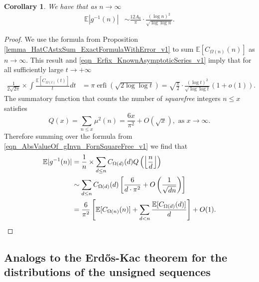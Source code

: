 \documentclass[11pt,reqno,a4letter]{article}
\numberwithin{figure}{section}
\numberwithin{table}{section}
\newcommand{\seqnum}[1]{\href{http://oeis.org/#1}{\color{ProcessBlue}{\underline{#1}}}}
\newcommand{\Floor}[2]{\ensuremath{\left\lfloor \frac{#1}{#2} \right\rfloor}}
\theoremstyle{plain}
\newtheorem{cor}[theorem]{Corollary}
\numberwithin{theorem}{section}
\theoremstyle{definition}
\begin{document}
\begin{cor}
\label{cor_ExpectationFormulaAbsgInvn_v2} 
We have that as $n \rightarrow \infty$ 
\begin{align*} 
\mathbb{E}|g^{-1}(n)| & \sim \frac{12A_0}{\pi} \cdot 
     \frac{(\log n)^2}{\sqrt{\log\log n}}. 
\end{align*} 
\end{cor} 
\begin{proof} 
We use the formula from Proposition \ref{lemma_HatCAstxSum_ExactFormulaWithError_v1} 
to sum $\mathbb{E}[C_{\Omega(n)}(n)]$ as $n \rightarrow \infty$.
This result and \eqref{eqn_Erfix_KnownAsymptoticSeries_v1} 
imply that for all sufficiently large $t \rightarrow +\infty$ 
\begin{align*} 
\frac{1}{2 \sqrt{2\pi}} \times \int \frac{\mathbb{E}[C_{\Omega(t)}(t)]}{t} dt & = 
     \pi \operatorname{erfi}\left(\sqrt{2\log\log t}\right) = 
     \sqrt{\frac{\pi}{2}} \cdot \frac{(\log t)^2}{\sqrt{\log\log t}} (1+o(1)). 
\end{align*} 
The summatory function that counts the 
number of \emph{squarefree} integers $n \leq x$ satisfies 
\cite[\S 18.6]{HARDYWRIGHT} \cite[\seqnum{A013928}]{OEIS} 
\[ 
Q(x) = \sum_{n \leq x} \mu^2(n) = \frac{6x}{\pi^2} + O\left(\sqrt{x}\right), 
     \text{\ as $x \rightarrow \infty$}. 
\]
Therefore summing over the formula from 
\eqref{eqn_AbsValueOf_gInvn_FornSquareFree_v1} we find that  
\begin{align} 
\notag 
\mathbb{E}|g^{-1}(n)| & = \frac{1}{n} \times \sum_{d \leq n} 
     C_{\Omega(d)}(d) Q\left(\Floor{n}{d}\right) \\ 
\notag 
     & \sim \sum_{d \leq n} C_{\Omega(d)}(d) \left[\frac{6}{d \cdot \pi^2} + O\left(\frac{1}{\sqrt{dn}}\right) 
     \right] \\ 
\notag 
     & = \frac{6}{\pi^2} \left[\mathbb{E}[C_{\Omega(n)}(n)] + \sum_{d<n} 
     \frac{\mathbb{E}[C_{\Omega(d)}(d)]}{d}\right] + O(1). 
     \qedhere 
\end{align} 
\end{proof} 

\subsection{Analogs to the Erd\H{o}s-Kac theorem for the distributions of the unsigned sequences} 
\label{subSection_ErdosKacTheorem_Analogs} 
\end{document}
